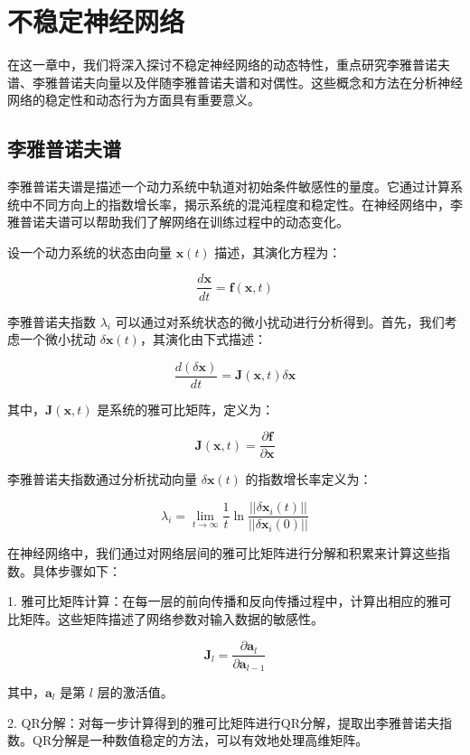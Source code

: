 
\chapter{不稳定神经网络}

在这一章中，我们将深入探讨不稳定神经网络的动态特性，重点研究李雅普诺夫谱、李雅普诺夫向量以及伴随李雅普诺夫谱和对偶性。这些概念和方法在分析神经网络的稳定性和动态行为方面具有重要意义。

\section{李雅普诺夫谱}

李雅普诺夫谱是描述一个动力系统中轨道对初始条件敏感性的量度。它通过计算系统中不同方向上的指数增长率，揭示系统的混沌程度和稳定性。在神经网络中，李雅普诺夫谱可以帮助我们了解网络在训练过程中的动态变化。

设一个动力系统的状态由向量 \(\mathbf{x}(t)\) 描述，其演化方程为：

\[ \frac{d\mathbf{x}}{dt} = \mathbf{f}(\mathbf{x}, t) \]

李雅普诺夫指数 \(\lambda_i\) 可以通过对系统状态的微小扰动进行分析得到。首先，我们考虑一个微小扰动 \(\delta \mathbf{x}(t)\)，其演化由下式描述：

\[ \frac{d (\delta \mathbf{x})}{dt} = \mathbf{J}(\mathbf{x}, t) \delta \mathbf{x} \]

其中，\(\mathbf{J}(\mathbf{x}, t)\) 是系统的雅可比矩阵，定义为：

\[ \mathbf{J}(\mathbf{x}, t) = \frac{\partial \mathbf{f}}{\partial \mathbf{x}} \]

李雅普诺夫指数通过分析扰动向量 \(\delta \mathbf{x}(t)\) 的指数增长率定义为：

\[ \lambda_i = \lim_{t \to \infty} \frac{1}{t} \ln \frac{||\delta \mathbf{x}_i(t)||}{||\delta \mathbf{x}_i(0)||} \]

在神经网络中，我们通过对网络层间的雅可比矩阵进行分解和积累来计算这些指数。具体步骤如下：

1. 雅可比矩阵计算：在每一层的前向传播和反向传播过程中，计算出相应的雅可比矩阵。这些矩阵描述了网络参数对输入数据的敏感性。

\[ \mathbf{J}_l = \frac{\partial \mathbf{a}_l}{\partial \mathbf{a}_{l-1}} \]

其中，\(\mathbf{a}_l\) 是第 \(l\) 层的激活值。

2. QR分解：对每一步计算得到的雅可比矩阵进行QR分解，提取出李雅普诺夫指数。QR分解是一种数值稳定的方法，可以有效地处理高维矩阵。

